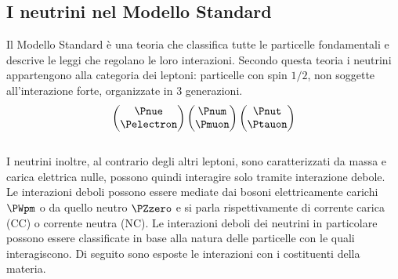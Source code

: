 \documentclass[../../main.tex]{subfiles}
\begin{document}
\subsection{I neutrini nel Modello Standard}
  \label{subsec:il-neutrino-nel-modello-standard}
  Il Modello Standard è una teoria che classifica tutte le particelle
  fondamentali e descrive le leggi che regolano le loro interazioni.
  Secondo questa teoria i neutrini appartengono alla categoria dei
  leptoni: particelle con spin $1/2$, non soggette all'interazione forte,
  organizzate in 3 generazioni.\\
  \begin{equation*}
    \begin{pmatrix}
      \Pnue \\ \Pelectron
    \end{pmatrix}
    \begin{pmatrix}
      \Pnum \\ \Pmuon
    \end{pmatrix}
    \begin{pmatrix}
      \Pnut \\ \Ptauon
    \end{pmatrix}
  \end{equation*}\\
  I neutrini inoltre, al contrario degli altri leptoni, sono caratterizzati
  da massa e carica elettrica nulle, possono quindi interagire solo tramite
  interazione debole.\\
  Le interazioni deboli possono essere mediate dai bosoni elettricamente carichi
  $\PWpm$ o da quello neutro $\PZzero$ e si parla rispettivamente di
  corrente carica (CC) o corrente neutra (NC).
  Le interazioni deboli dei neutrini in particolare possono essere classificate
  in base alla natura delle particelle con le quali interagiscono.
  Di seguito sono esposte le interazioni con i costituenti della materia.
\end{document}
